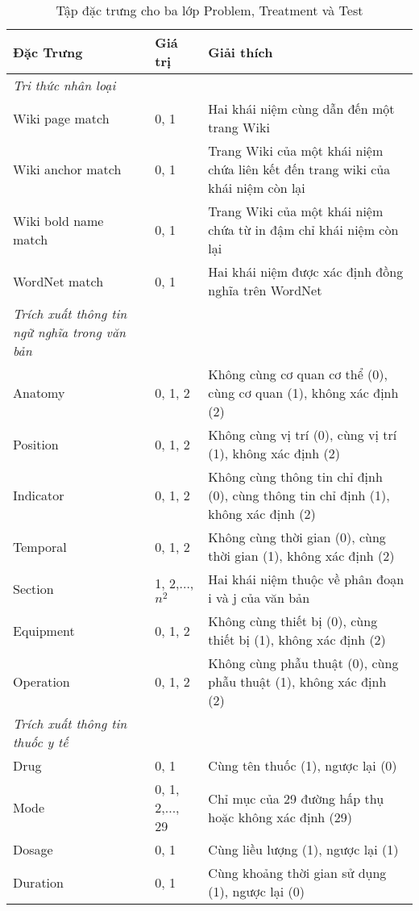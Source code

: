 \begin{table}[th]
\centering
\caption{Tập đặc trưng cho ba lớp Problem, Treatment và Test \label{tab:ProbTreatTestFeatures}}
\footnotesize\sffamily

\begin{tabularx}{\textwidth}{@{}P{\raggedright}{0.3}lL@{}}
\toprule 
\textbf{Đặc Trưng} & \textbf{Giá trị} & \textbf{Giải thích}\\
\midrule
\emph{Tri thức nhân loại}\\
\quad Wiki page match & 0, 1 & Hai khái niệm cùng dẫn đến một trang Wiki\\
\quad Wiki anchor match & 0, 1 & Trang Wiki của một khái niệm chứa liên kết đến trang wiki của khái niệm còn lại\\
\quad Wiki bold name match & 0, 1 & Trang Wiki của một khái niệm chứa từ in đậm chỉ khái niệm còn lại\\
\quad WordNet match & 0, 1 & Hai khái niệm được xác định đồng nghĩa trên WordNet\\
\emph{Trích xuất thông tin ngữ nghĩa trong văn bản}\\
\quad Anatomy & 0, 1, 2 & Không cùng cơ quan cơ thể (0), cùng cơ quan (1), không xác định (2)\\
\quad Position & 0, 1, 2 & Không cùng vị trí (0), cùng vị trí (1), không xác định (2)\\
\quad Indicator & 0, 1, 2 & Không cùng thông tin chỉ định (0), cùng thông tin chỉ định (1), không xác định (2)\\
\quad Temporal & 0, 1, 2 & Không cùng thời gian (0), cùng thời gian (1), không xác định (2)\\
\quad Section & 1, 2,..., $n^{2}$ & Hai khái niệm thuộc về phân đoạn i và j của văn bản\\
\quad Equipment & 0, 1, 2 & Không cùng thiết bị (0), cùng thiết bị (1), không xác định (2)\\
\quad Operation & 0, 1, 2 & Không cùng phẫu thuật (0), cùng phẫu thuật (1), không xác định (2)\\
\emph{Trích xuất thông tin thuốc y tế}\\
\quad Drug & 0, 1 & Cùng tên thuốc (1), ngược lại (0)\\
\quad Mode & 0, 1, 2,..., 29 & Chỉ mục của 29 đường hấp thụ hoặc không xác định (29)\\
\quad Dosage & 0, 1 & Cùng liều lượng (1), ngược lại (1)\\
\quad Duration & 0, 1 & Cùng khoảng thời gian sử dụng (1), ngược lại (0)\\

\end{tabularx}
\end{table}
